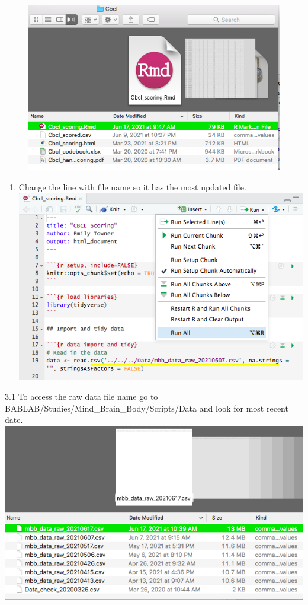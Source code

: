 \documentclass[]{book}
\providecommand{\tightlist}{%
  \setlength{\itemsep}{0pt}\setlength{\parskip}{0pt}}
\begin{document}
\begin{figure}
\centering
\includegraphics{images/report_card_online/7.png}
\caption{}
\end{figure}

\begin{enumerate}
\def\labelenumi{\arabic{enumi}.}
\setcounter{enumi}{2}
\tightlist
\item
  Change the line with file name so it has the most updated file.
  \includegraphics{images/report_card_online/8.png}
\end{enumerate}

3.1 To access the raw data file name go to BABLAB/Studies/Mind\_Brain\_Body/Scripts/Data and look for most recent date.
\includegraphics{images/report_card_online/9.png}
\end{document}
